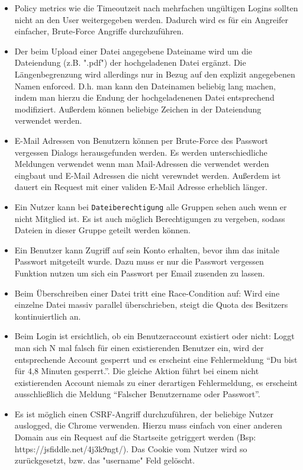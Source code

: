 \documentclass[12pt,DIV14,BCOR10mm,a4paper,parskip=half-,headsepline,headinclude,english,ngerman,bibliography=totocnumbered]{scrreprt}
\begin{document}
\begin{itemize}
  \item Policy metrics wie die Timeoutzeit nach mehrfachen ungültigen Logins sollten nicht an den User weitergegeben werden. Dadurch wird es für ein Angreifer einfacher, Brute-Force Angriffe durchzuführen. \autocite[Loc. 5087]{book:wahh}
  \item Der beim Upload einer Datei angegebene Dateiname wird um die Dateiendung (z.B. ".pdf") der hochgeladenen Datei ergänzt. Die Längenbegrenzung wird allerdings nur in Bezug auf den explizit angegebenen Namen enforced. D.h. man kann den Dateinamen beliebig lang machen, indem man hierzu die Endung der hochgeladenenen Datei entsprechend modifiziert. Außerdem können beliebige Zeichen in der Dateiendung verwendet werden.
  \item E-Mail Adressen von Benutzern können per Brute-Force des Passwort vergessen Dialogs herausgefunden werden. Es werden unterschiedliche Meldungen verwendet wenn man Mail-Adressen die verwendet werden eingbaut und E-Mail Adressen die nicht verewndet werden. Außerdem ist dauert ein Request mit einer validen E-Mail Adresse erheblich länger.
  \item Ein Nutzer kann bei \texttt{Dateiberechtigung} alle Gruppen sehen auch wenn er nicht Mitglied ist. Es ist auch möglich Berechtigungen zu vergeben, sodass Dateien in dieser Gruppe geteilt werden können.
\item Ein Benutzer kann Zugriff auf sein Konto erhalten, bevor ihm das initale Passwort mitgeteilt wurde. Dazu muss er nur die Passwort vergessen Funktion nutzen um sich ein Passwort per Email zusenden zu lassen.
\item Beim Überschreiben einer Datei tritt eine Race-Condition auf: Wird eine einzelne Datei massiv parallel überschrieben, steigt die Quota des Besitzers kontinuiertlich an.
\item Beim Login ist ersichtlich, ob ein Benutzeraccount existiert oder nicht: Loggt man sich N mal falsch für einen existierenden Benutzer ein, wird der entsprechende Account gesperrt und es erscheint eine Fehlermeldung \enquote{Du bist für 4,8 Minuten gesperrt.}. Die gleiche Aktion führt bei einem nicht existierenden Account niemals zu einer derartigen Fehlermeldung, es erscheint ausschließlich die Meldung \enquote{Falscher Benutzername oder Passwort}.
\item Es ist möglich einen CSRF-Angriff durchzuführen, der beliebige Nutzer auslogged, die Chrome verwenden. Hierzu muss einfach von einer anderen Domain aus ein Request auf die Startseite getriggert werden (Bsp: https://jsfiddle.net/4j3k9ngt/). Das Cookie vom Nutzer wird so zurückgesetzt, bzw. das "username" Feld gelöscht.
\end{itemize}
\end{document}
